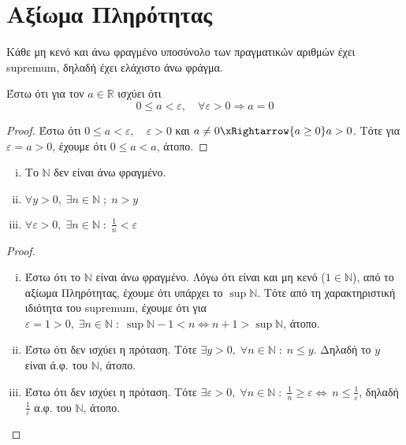 \documentclass[main.tex]{subfiles}
\begin{document}
\section{Αξίωμα Πληρότητας}

Κάθε μη κενό και άνω φραγμένο υποσύνολο των πραγματικών αριθμών έχει 
supremum, δηλαδή έχει ελάχιστο άνω φράγμα.

\begin{prop}
    Έστω ότι για τον $a \in \mathbb{R}$ ισχύει ότι 
    \[
        0 \leq a < \varepsilon, \quad \forall \varepsilon >0 \Rightarrow a =0 
    \] 
\end{prop}

\begin{proof}
\item {}
    Έστω ότι $ 0 \leq a < \varepsilon, \quad \varepsilon >0 $ και 
    $ a \neq 0 \xRightarrow{a \geq 0} a > 0$. Τότε για $ \varepsilon = 
    a > 0$, έχουμε ότι $ 0 \leq a < a $, άτοπο.
\end{proof}

\begin{prop}
\item {}
    \begin{enumerate}[i)]
        \item Το $ \mathbb{N} $ δεν είναι άνω φραγμένο.
        \item $ \forall y > 0, \; \exists n \in \mathbb{N} \; ; \; 
            n > y$
        \item $ \forall \varepsilon >0, \; \exists n \in \mathbb{N} \; 
            : \; \frac{1}{n} < \varepsilon$
    \end{enumerate}
\end{prop}

\begin{proof}
\item {}
    \begin{enumerate}[i)]
        \item Έστω ότι το $ \mathbb{N} $ είναι άνω φραγμένο. Λόγω ότι 
            είναι και μη κενό ($ 1 \in \mathbb{N} $), από το αξίωμα 
            Πληρότητας, έχουμε ότι υπάρχει το $ \sup \mathbb{N} $. 
            Τότε από τη χαρακτηριστική ιδιότητα του supremum, έχουμε 
            ότι για $ \varepsilon = 1 >0, \; \exists n \in \mathbb{N} 
            \; : \; \sup \mathbb{N}-1 < n \Leftrightarrow n+1 > \sup
            \mathbb{N} $, άτοπο.

        \item Έστω ότι δεν ισχύει η πρόταση. Τότε  $ \exists y >0, \; 
            \forall n \in \mathbb{N} \; : \; n \leq y$. Δηλαδή
            το  $y$  είναι ά.φ. του $\mathbb{N}$, άτοπο.

        \item Έστω ότι δεν ισχύει η πρόταση. Τότε $ \exists 
            \varepsilon >0 , \; \forall n \in \mathbb{N} \; : \; 
            \frac{1}{n} \geq \varepsilon  \Leftrightarrow \ n \leq 
            \frac{1}{\varepsilon} $, δηλαδή $ \frac{1}{\varepsilon} $ 
            α.φ. του $ \mathbb{N} $, άτοπο. 
    \end{enumerate}
\end{proof}
\end{document}
